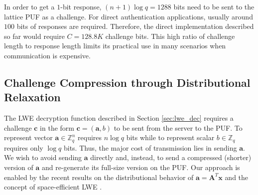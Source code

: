 In order to get a $1$-bit response, $(n+1)\log q = 1288$ bits need to be sent to the lattice PUF as a challenge.
For direct authentication applications, usually around $100$ bits of responses are required. Therefore, the direct implementation described so far would require $C = 128.8K$ challenge bits.
This high ratio of challenge length to response length limits its practical use in many scenarios when communication is expensive.



\vspace{-0.5em}
\subsection{Challenge Compression through Distributional Relaxation}
\label{sec:lfsr}
The LWE decryption function described in Section \ref{sec:lwe_dec} requires a challenge $\mathbf{c}$ in the form $\mathbf{c}=(\mathbf{a},b)$ to be sent from the server to the PUF. 
To represent vector $\mathbf{a} \in \mathbb{Z}_q^n$ requires $n\log q$ bits while to represent scalar $b \in \mathbb{Z}_q$  requires only $\log q$ bits. 
Thus, the major cost of transmission lies in sending $\mathbf{a}$. 
We wish to avoid sending $\mathbf{a}$ directly and, instead, to send a compressed (shorter) version of $\mathbf{a}$  and re-generate its full-size version on the PUF.
Our approach is enabled by the recent results on the distributional behavior of $\mathbf{a}=\mathbf{A}^T\mathbf{x}$ \cite{akavia2009simultaneous} and the concept of space-efficient LWE \cite{galbraith2013space}.

